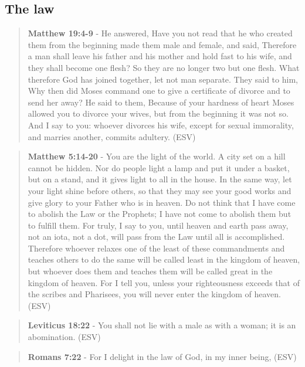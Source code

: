 \documentclass[11pt]{article}
\begin{document}
\subsection{The law}
\label{sec:orgd57e02f}

\begin{quote}
\textbf{Matthew 19:4-9} - He answered, Have you not read that he who created them from the beginning made them male and female, and said, Therefore a man shall leave his father and his mother and hold fast to his wife, and they shall become one flesh? So they are no longer two but one flesh. What therefore God has joined together, let not man separate. They said to him, Why then did Moses command one to give a certificate of divorce and to send her away? He said to them, Because of your hardness of heart Moses allowed you to divorce your wives, but from the beginning it was not so. And I say to you: whoever divorces his wife, except for sexual immorality, and marries another, commits adultery. (ESV)
\end{quote}

\begin{quote}
\textbf{Matthew 5:14-20} - You are the light of the world. A city set on a hill cannot be hidden. Nor do people light a lamp and put it under a basket, but on a stand, and it gives light to all in the house. In the same way, let your light shine before others, so that they may see your good works and give glory to your Father who is in heaven. Do not think that I have come to abolish the Law or the Prophets; I have not come to abolish them but to fulfill them. For truly, I say to you, until heaven and earth pass away, not an iota, not a dot, will pass from the Law until all is accomplished. Therefore whoever relaxes one of the least of these commandments and teaches others to do the same will be called least in the kingdom of heaven, but whoever does them and teaches them will be called great in the kingdom of heaven. For I tell you, unless your righteousness exceeds that of the scribes and Pharisees, you will never enter the kingdom of heaven. (ESV)
\end{quote}

\begin{quote}
\textbf{Leviticus 18:22} - You shall not lie with a male as with a woman; it is an abomination. (ESV)
\end{quote}

\begin{quote}
\textbf{Romans 7:22} - For I delight in the law of God, in my inner being, (ESV)
\end{quote}
\end{document}

